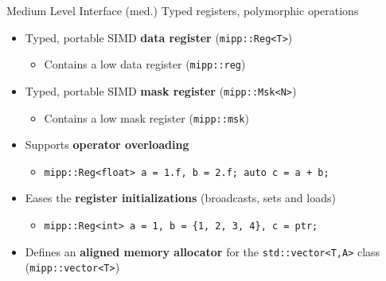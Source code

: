 \begin{frame}[fragile]{Medium Level Interface (med.)}
  \vfill
  Typed registers, polymorphic operations
  \vspace{0.3cm}
  \begin{itemize}
    \item \textcolor{Paired-5}{Typed}, portable SIMD \textbf{data register} (\texttt{mipp::Reg<\textcolor{Paired-1}{T}>})
    \begin{itemize}
      \item Contains a \MIPP low data register (\verb|mipp::reg|)
    \end{itemize}
    \vspace{0.2cm}
    \item \textcolor{Paired-5}{Typed}, portable SIMD \textbf{mask register} (\texttt{mipp::Msk<\textcolor{Paired-1}{N}>})
    \begin{itemize}
      \item Contains a \MIPP low mask register (\verb|mipp::msk|)
    \end{itemize}
    \vspace{0.2cm}
    \item Supports \textcolor{Paired-5}{\textbf{operator overloading}}
    \begin{itemize}
      \item \texttt{mipp::Reg<\textcolor{Paired-1}{float}> a = 1.f, b = 2.f; \textcolor{Paired-1}{auto} c = a + b;}
    \end{itemize}
    \vspace{0.2cm}
    \item Eases the \textcolor{Paired-5}{\textbf{register initializations}} (broadcasts, sets and loads)
    \begin{itemize}
      \item \texttt{mipp::Reg<\textcolor{Paired-1}{int}> a = 1, b = \{1, 2, 3, 4\}, c = ptr;}
    \end{itemize}
    \vspace{0.2cm}
    \item Defines an \textbf{aligned memory allocator} for the \texttt{std::vector<\textcolor{Paired-1}{T},\textcolor{Paired-1}{A}>} class (\texttt{mipp::vector<\textcolor{Paired-1}{T}>})
  \end{itemize}
  \vfill
\end{frame}

